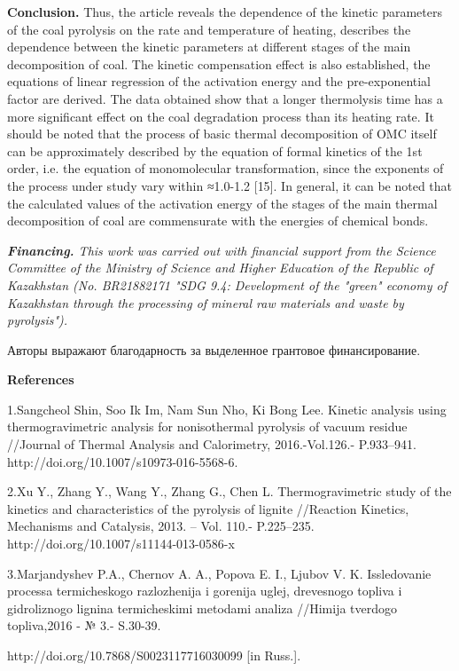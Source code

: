 {\bfseries Conclusion.} Thus, the article reveals the dependence of the
kinetic parameters of the coal pyrolysis on the rate and temperature of
heating, describes the dependence between the kinetic parameters at
different stages of the main decomposition of coal. The kinetic
compensation effect is also established, the equations of linear
regression of the activation energy and the pre-exponential factor are
derived. The data obtained show that a longer thermolysis time has a
more significant effect on the coal degradation process than its heating
rate. It should be noted that the process of basic thermal decomposition
of OMC itself can be approximately described by the equation of formal
kinetics of the 1st order, i.e. the equation of monomolecular
transformation, since the exponents of the process under study vary
within ≈1.0-1.2 {[}15{]}. In general, it can be noted that the
calculated values of the activation energy of the stages of the main
thermal decomposition of coal are commensurate with the energies of
chemical bonds.

\emph{{\bfseries Financing.} This work was carried out with financial
support from the Science Committee of the Ministry of Science and Higher
Education of the Republic of Kazakhstan (No. BR21882171 "SDG 9.4:
Development of the "green" economy of Kazakhstan through the processing
of mineral raw materials and waste by pyrolysis").}

Авторы выражают благодарность за выделенное грантовое финансирование.

{\bfseries References}

1.Sangcheol Shin, Soo Ik Im, Nam Sun Nho, Ki Bong Lee. Kinetic analysis
using thermogravimetric analysis for nonisothermal pyrolysis of vacuum
residue //Journal of Thermal Analysis and Calorimetry, 2016.-Vol.126.-
P.933--941. http://doi.org/10.1007/s10973-016-5568-6.

2.Xu Y., Zhang Y., Wang Y., Zhang G., Chen L. Thermogravimetric study of
the kinetics and characteristics of the pyrolysis of lignite //Reaction
Kinetics, Mechanisms and Catalysis, 2013. -- Vol. 110.- P.225--235.
http://doi.org/10.1007/s11144-013-0586-x

3.Mar\textquotesingle jandyshev P.A., Chernov A. A., Popova E. I.,
Ljubov V. K. Issledovanie processa termicheskogo razlozhenija i gorenija
uglej, drevesnogo topliva i gidroliznogo lignina termicheskimi metodami
analiza //Himija tverdogo topliva,2016 - № 3.- S.30-39.

http://doi.org/10.7868/S0023117716030099 {[}in Russ.{]}.

